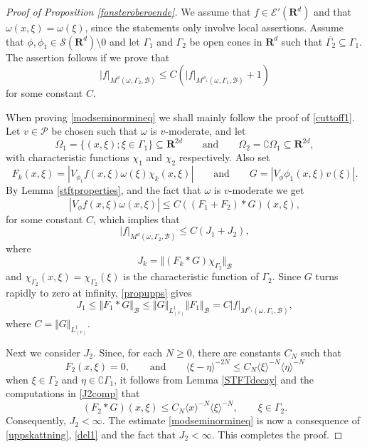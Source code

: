 \documentclass[12pt,a4paper,reqno]{amsart}
\numberwithin{equation}{section}
\numberwithin{thm}{section}
\theoremstyle{definition}
\theoremstyle{remark}
\begin{document}
\begin{proof}[Proof of Proposition \ref{fonsteroberoende}]
We assume that $f\in \mathscr{E}'({\mathbf R^{d}})$ and that $\omega(x,\xi) =\omega(\xi)$, since the statements only involve local assertions. Assume that $\phi, \phi_1 \in \mathscr S({\mathbf R^{d}}){\setminus 0}$ and let $\Gamma _1$ and $\Gamma_2$ be open cones in ${\mathbf R^{d}}$ such that $\overline{\Gamma_2}\subseteq \Gamma_1$. The assertion follows if we prove that 
\begin{equation}\label{modseminormineq}
|f|_{{M^{{\phi}}(\omega _{{}},{{\Gamma_2}},\mathscr{B})}} \leq C(|f|_{{M^{{\phi_1}}(\omega _{{}},{{\Gamma_1}},\mathscr{B})}} + 1)
\end{equation}
for some constant $C$.

\par

When proving \eqref{modseminormineq} we shall mainly follow the proof
of \eqref{cuttoff1}. Let
$v \in \mathscr P$ be chosen such that $\omega$ is $v$-moderate, and let
$$
\Omega_1 = \{ (x, \xi) ; \xi\in \Gamma_1 \} \subseteq {\mathbf R^{{2d}}} \qquad
\text{and} \qquad \Omega_2 = \complement \Omega_1 \subseteq {\mathbf R^{{2d}}},
$$
with characteristic functions $\chi_1$ and $\chi_2$ respectively. Also
set
$$
F _k(x, \xi) = |V_{\phi_1}f(x, \xi)\omega(\xi)\chi _k(x, \xi)| \qquad
\text{and} \qquad G = |V_{\phi}\phi_1(x, \xi)v(\xi)|.
$$
By Lemma \ref{stftproperties}, and the fact that $\omega$ is $v$-moderate we get
$$
|V_{\phi}f(x, \xi)\omega(x, \xi)| \leq  C((F_1 + F_2) * G)(x, \xi),
$$
for some constant $C$, which implies that
\begin{equation}\label{uppskattning}
|f|_{{M^{{\phi}}(\omega _{{}},{{\Gamma_2}},\mathscr{B})}} \leq C (J _1 + J _2), 
\end{equation}
where
$$
J_k = {\Vert {(F_k * G)\chi_{\Gamma_2}}\Vert _{{\mathscr B}}}
$$
and $\chi_{\Gamma_2}(x,\xi)=\chi_{\Gamma_2}(\xi)$ is the characteristic function of $\Gamma_2$.
Since $G$ turns rapidly to zero at infinity, \eqref{propupps} gives
\begin{equation}\label{del1}
J_1 \leq {\Vert {F_1*G}\Vert _{{\mathscr B}}} \leq {\Vert G\Vert _{{L^1_{(v)}}}} {\Vert {F_1}\Vert _{{\mathscr B}}}=C|f|_{{M^{{\phi_1}}(\omega _{{}},{{\Gamma_1}},\mathscr{B})}}, 
\end{equation}
where $C = {\Vert {G}\Vert _{{L^1_{(v)}}}}$.

\par

Next we consider $J_2$. Since, for each $N \geq 0$, there are constants $C_N$ such that
$$
F_2(x, \xi)=0,\qquad \text{and} \qquad {\langle {\xi-\eta}\rangle}^{-2N}\leq C_N {\langle \xi\rangle}^{-N}{\langle \eta\rangle}^{-N}
$$
when $\xi\in \Gamma_2$ and $\eta \in \complement \Gamma_1$, it follows from Lemma \ref{STFTdecay} and the computations in \eqref{J2comp} that
$$
(F_2 * G)(x, \xi) \leq C_N {\langle x\rangle}^{-N}{\langle \xi\rangle}^{-N},\qquad  \xi\in \Gamma_2.
$$
Consequently, $J_2 < \infty$. The estimate \eqref{modseminormineq} is now a consequence of
\eqref{uppskattning}, \eqref{del1} and the fact that $J_2 < \infty$.
This completes the proof.
\end{proof}
\end{document}
